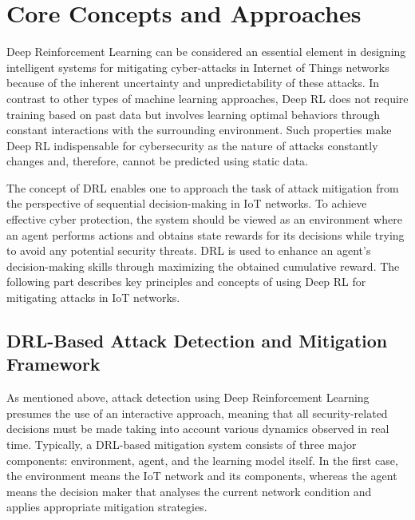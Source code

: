 \documentclass[12pt]{article}
\begin{document}
	

	\section{Core Concepts and Approaches}
	Deep Reinforcement Learning can be considered an essential element in designing intelligent systems for mitigating cyber-attacks in Internet of Things networks because of the inherent uncertainty and unpredictability of these attacks. In contrast to other types of machine learning approaches, Deep RL does not require training based on past data but involves learning optimal behaviors through constant interactions with the surrounding environment. Such properties make Deep RL indispensable for cybersecurity as the nature of attacks constantly changes and, therefore, cannot be predicted using static data.

The concept of DRL enables one to approach the task of attack mitigation from the perspective of sequential decision-making in IoT networks. To achieve effective cyber protection, the system should be viewed as an environment where an agent performs actions and obtains state rewards for its decisions while trying to avoid any potential security threats. DRL is used to enhance an agent's decision-making skills through maximizing the obtained cumulative reward. The following part describes key principles and concepts of using Deep RL for mitigating attacks in IoT networks.
\subsection{DRL-Based Attack Detection and Mitigation Framework}
As mentioned above,\cite{Janakiraman2023} attack detection using Deep Reinforcement Learning presumes the use of an interactive approach, meaning that all security-related decisions must be made taking into account various dynamics observed in real time. Typically, a DRL-based mitigation system consists of three major components: environment, agent, and the learning model itself. In the first case, the environment means the IoT network and its components, whereas the agent means the decision maker that analyses the current network condition and applies appropriate mitigation strategies.
\end{document}
